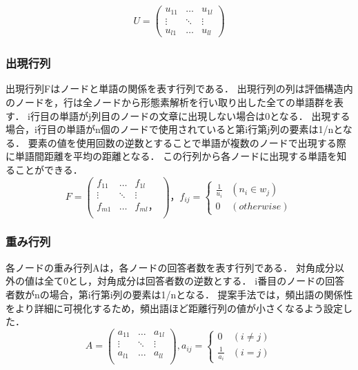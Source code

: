 \documentclass[syuuron]{kuee}
\begin{document}
				\begin{eqnarray}
				 U = \left(
				    \begin{array}{cccc}
				    	u_{11} & \ldots & u_{1l} \\
				    	\vdots & \ddots & \vdots \\
				    	u_{l1} & \ldots & u_{ll}
					\end{array}
				 \right)
				\end{eqnarray}	
		
			\subsubsection{出現行列}
				出現行列Fはノードと単語の関係を表す行列である．
				出現行列の列は評価構造内のノードを，行は全ノードから形態素解析を行い取り出した全ての単語群を表す．
				i行目の単語がj列目のノードの文章に出現しない場合は0となる．
				出現する場合，i行目の単語がn個のノードで使用されていると第i行第j列の要素は1/nとなる．
				要素の値を使用回数の逆数とすることで単語が複数のノードで出現する際に単語間距離を平均の距離となる．
				この行列から各ノードに出現する単語を知ることができる．
				\begin{equation}
				 	F = \left(
				    \begin{array}{cccc}
				    	f_{11} & \ldots & f_{1l} \\
				    	\vdots & \ddots & \vdots \\
				    	f_{m1} & \ldots & f_{ml}，\\ 
					\end{array}
					\right)，
				 	f_{ij} = \left\{ \begin{array}{ll}
						\frac{1}{u_i} & (n_i \in w_j) \\
				    	0 & (otherwise)
				  	\end{array} 
				  	\right.
				\end{equation}
				
			\subsubsection{重み行列}
				各ノードの重み行列Aは，各ノードの回答者数を表す行列である．
				対角成分以外の値は全て0とし，対角成分は回答者数の逆数とする．
				i番目のノードの回答者数がnの場合，第i行第i列の要素は1/nとなる．
				提案手法では，頻出語の関係性をより詳細に可視化するため，頻出語ほど距離行列の値が小さくなるよう設定した．
				\begin{equation}
				 A = \left(
				    \begin{array}{cccc}
				    	a_{11} & \ldots & a_{1l} \\
				    	\vdots & \ddots & \vdots \\
				    	a_{l1} & \ldots & a_{ll} \\
					\end{array}
				 \right),
				 a_{ij} = \left\{ \begin{array}{ll}
				     0 & (i ≠ j) \\
				     \frac{1}{a_i} & (i = j)
				  \end{array} \right.
				\end{equation}
\end{document}

